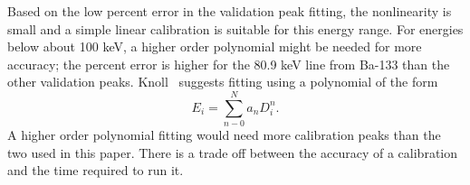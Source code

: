 Based on the low percent error in the validation peak fitting, the nonlinearity is small and a simple linear calibration is suitable for this energy range. For energies below about 100 keV, a higher order polynomial might be needed for more accuracy; the percent error is higher for the 80.9 keV line from Ba-133 than the other validation peaks. Knoll~\cite{knoll2010radiation} suggests fitting using a polynomial of the form 
\begin{equation}
E_i = \sum_{n-0}^N a_n D_i^n .
\end{equation}
A higher order polynomial fitting would need more calibration peaks than the two used in this paper. There is a trade off between the accuracy of a calibration and the time required to run it.
